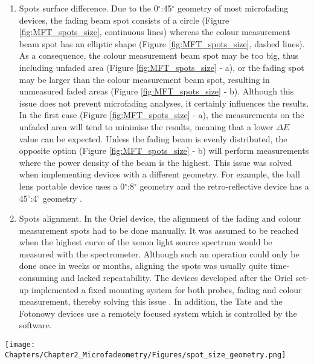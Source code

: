 \begin{enumerate}
    \item Spots surface difference. Due to the 0$^\circ$:45$^\circ$ geometry of most microfading devices, the fading beam spot consists of a circle (Figure \ref{fig:MFT_spots_size}, continuous lines) whereas the colour measurement beam spot has an elliptic shape (Figure \ref{fig:MFT_spots_size}, dashed lines). As a consequence, the colour measurement beam spot may be too big, thus including unfaded area (Figure \ref{fig:MFT_spots_size} - a), or the fading spot may be larger than the colour measurement beam spot, resulting in unmeasured faded areas (Figure \ref{fig:MFT_spots_size} - b). Although this issue does not prevent microfading analyses, it certainly influences the results. In the first case (Figure \ref{fig:MFT_spots_size} - a), the measurements on the unfaded area will tend to minimise the results, meaning that a lower $\Delta E$ value can be expected. Unless the fading beam is evenly distributed, the opposite option (Figure \ref{fig:MFT_spots_size} - b) will perform measurements where the power density of the beam is the highest. This issue was solved when implementing devices with a different geometry. For example, the ball lens portable device uses a 0$^\circ$:8$^\circ$ geometry \citep[120-121]{pesme_development_2016} and the retro-reflective device has a 45$^\circ$:4$^\circ$ geometry \citep[11]{beltran_advancing_2019}.
    \item Spots alignment. In the Oriel device, the alignment of the fading and colour measurement spots had to be done manually. It was assumed to be reached when the highest curve of the xenon light source spectrum would be measured with the spectrometer. Although such an operation could only be done once in weeks or months, aligning the spots was usually quite time-consuming and lacked repeatability. The devices developed after the Oriel set-up implemented a fixed mounting system for both probes, fading and colour measurement, thereby solving this issue \citep{lerwill_portable_2008, lojewski_note_2011}. In addition, the Tate and the Fotonowy devices use a remotely focused system which is controlled by the software.\\
\end{enumerate}


\begin{figure*}[!h]
\centering
\texttt{[image: Chapters/Chapter2\_Microfadeometry/Figures/spot\_size\_geometry.png]}
\caption[\hspace{0.3cm}Spots size surface comparison]{Spots size surface comparison.}
\label{fig:MFT_spots_size}
\end{figure*}




